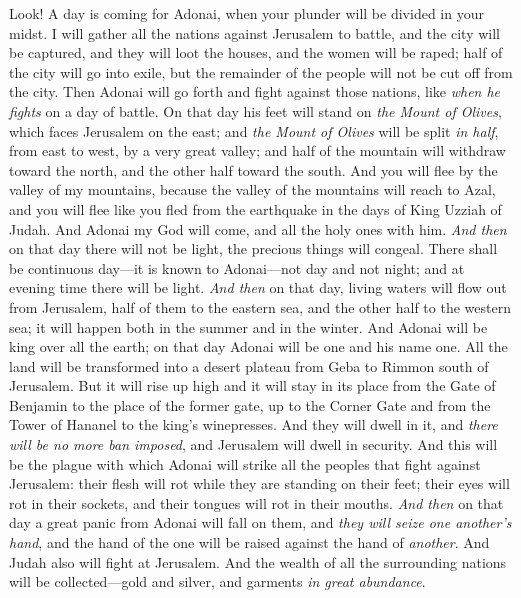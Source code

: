\begin{biblechapter} %
 Look! A day is coming for Adonai, when your plunder will be divided in your midst.
\verse I will gather all the nations against Jerusalem to battle, and the city will be captured, and they will loot the houses, and the women will be raped; half of the city will go into exile, but the remainder of the people will not be cut off from the city.
\verse Then Adonai will go forth and fight against those nations, like \textit{when he fights} on a day of battle.
\verse On that day his feet will stand on \textit{the Mount of Olives}, which faces Jerusalem on the east; and \textit{the Mount of Olives} will be split \textit{in half}, from east to west, by a very great valley; and half of the mountain will withdraw toward the north, and the other half toward the south.
\verse And you will flee by the valley of my mountains, because the valley of the mountains will reach to Azal, and you will flee like you fled from the earthquake in the days of King Uzziah of Judah. And Adonai my God will come, and all the holy ones with him.
\verse \textit{And then} on that day there will not be light, the precious things will congeal.
\verse There shall be continuous day—it is known to Adonai—not day and not night; and at evening time there will be light.
\verse \textit{And then} on that day, living waters will flow out from Jerusalem, half of them to the eastern sea, and the other half to the western sea; it will happen both in the summer and in the winter.
\verse And Adonai will be king over all the earth; on that day Adonai will be one and his name one.
\verse All the land will be transformed into a desert plateau from Geba to Rimmon south of Jerusalem. But it will rise up high and it will stay in its place from the Gate of Benjamin to the place of the former gate, up to the Corner Gate and from the Tower of Hananel to the king’s winepresses.
\verse And they will dwell in it, and \textit{there will be no more ban imposed}, and Jerusalem will dwell in security.
\verse And this will be the plague with which Adonai will strike all the peoples that fight against Jerusalem: their flesh will rot while they are standing on their feet; their eyes will rot in their sockets, and their tongues will rot in their mouths.
\verse \textit{And then} on that day a great panic from Adonai will fall on them, and \textit{they will seize one another’s hand}, and the hand of the one will be raised against the hand of \textit{another}.
\verse And Judah also will fight at Jerusalem. And the wealth of all the surrounding nations will be collected—gold and silver, and garments \textit{in great abundance}.

\end{biblechapter}

